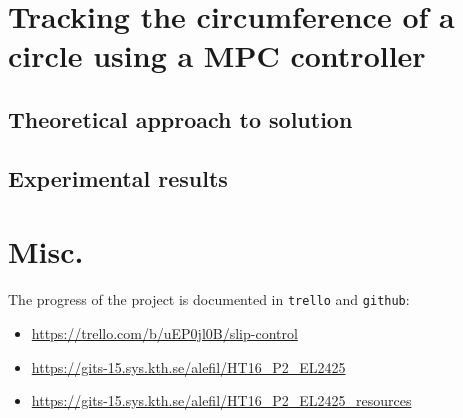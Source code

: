 \documentclass[a4paper,12pt,oneside,onecolumn]{article} %
\begin{document}
  \newpage

  \section{Tracking the circumference of a circle using a MPC controller}

    \subsection{Theoretical approach to solution}
      

    \subsection{Experimental results}
      


  \newpage

\section{Misc.}

The progress of the project is documented in \texttt{trello} and \texttt{github}:

\begin{itemize}
  \item \url{https://trello.com/b/uEP0jl0B/slip-control}
  \item \url{https://gits-15.sys.kth.se/alefil/HT16_P2_EL2425}
  \item \url{https://gits-15.sys.kth.se/alefil/HT16_P2_EL2425_resources}
\end{itemize}
\end{document}
